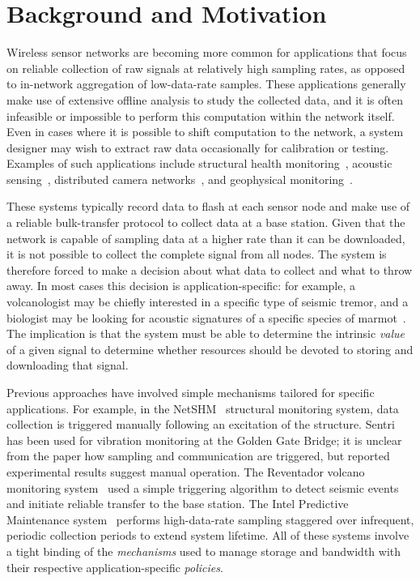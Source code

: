 \section{Background and Motivation}
\label{lance-sec-motivation}


Wireless sensor networks are becoming more common for applications
that focus on reliable collection of raw signals at relatively high sampling
rates, as opposed to in-network aggregation of low-data-rate samples.
These applications generally make use of extensive offline analysis 
to study the collected data, and it is often infeasible
or impossible to perform this computation within the network itself.
Even in cases where it is possible to shift computation to the network, a
system designer may wish to extract raw data occasionally for calibration
or testing.  Examples of such applications include structural health
monitoring~\cite{netshm-spots06,ggb-ipsn07,wimms-lynch06}, acoustic
sensing~\cite{vango,vigilnet,girod-ipsn07,enviromic}, distributed camera
networks~\cite{cyclops}, and geophysical monitoring~\cite{volcano-osdi06}.

These systems typically record data to flash at each sensor node 
and make use of a reliable bulk-transfer protocol to collect data at 
a base station. Given that the network is capable of sampling data at
a higher rate than it can be downloaded, it is not possible to 
collect the complete signal from all nodes. 
The system is therefore forced to make
a decision about what data to collect and what to throw away. In most
cases this decision is application-specific: for example, a
volcanologist may be chiefly interested in a specific type of seismic
tremor, and a biologist may be looking for acoustic signatures of a 
specific species of marmot~\cite{girod-ipsn07}. The implication is that
the system must be able to determine the intrinsic {\em value} of
a given signal to determine whether resources should be devoted to 
storing and downloading that signal.

Previous approaches have involved simple mechanisms tailored for 
specific applications. For example, in the
NetSHM~\cite{netshm-spots06,netshm-emnets05} structural monitoring 
system, data collection is 
triggered manually following an excitation of the structure.
Sentri~\cite{ggb-ipsn07} has been used for vibration monitoring at
the Golden Gate Bridge; it is unclear from the paper how sampling and
communication are triggered, but reported experimental results
suggest manual operation. The Reventador volcano monitoring 
system~\cite{volcano-osdi06} used a simple triggering algorithm to detect 
seismic events and initiate reliable transfer to the base station. 
The Intel Predictive Maintenance
system~\cite{intel-northseasensys} performs high-data-rate sampling
staggered over infrequent, periodic collection periods to extend
system lifetime. 
All of these systems involve a tight binding of the {\em mechanisms} 
used to manage storage and bandwidth with their respective 
application-specific {\em policies}.

